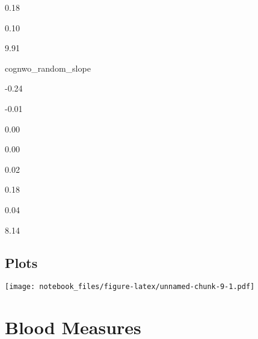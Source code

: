\documentclass[]{book}
\begin{document}
0.18

0.10

9.91

cognwo\_random\_slope

-0.24

-0.01

0.00

0.00

0.02

0.18

0.04

8.14

\hypertarget{plots-6}{%
\subsection{Plots}\label{plots-6}}

\texttt{[image: notebook\_files/figure-latex/unnamed-chunk-9-1.pdf]}

\hypertarget{blood-measures}{%
\section{Blood Measures}\label{blood-measures}}
\end{document}
